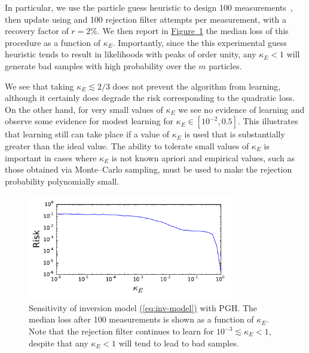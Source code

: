 \documentclass[twoside]{article}
\newcommand{\eq}[1]{\hyperref[eq:#1]{(\ref*{eq:#1})}}
\newcommand{\fig}[1]{\hyperref[fig:#1]{Figure~\ref*{fig:#1}}}
\begin{document}
In particular,
we use the particle guess heuristic to design 100 measurements~\cite{wiebe_efficient_2015}, then update using
and 100 rejection filter attempts per measurement, with a recovery factor of
$r=2\%$. We then report in \fig{sensitivity-kappa} the median loss of this procedure as a function
of $\kappa_E$. Importantly, since the this experimental guess heuristic tends to result in likelihoods with
peaks of order unity, any $\kappa_E < 1$ will generate bad samples with high probability over the $m$ particles.

We see that taking $\kappa_E\lesssim 2/3$ does not prevent the algorithm from learning, although it certainly does
degrade the risk corresponding to the quadratic loss.  On the other hand, for very small values of $\kappa_E$ we see no evidence of learning  and observe some evidence for modest learning for $\kappa_E \in [10^{-2}, 0.5]$.  This illustrates that learning still can take place if a value of $\kappa_E$ is used that
is substantially greater than the ideal value.  The ability to tolerate small values of $\kappa_E$ is important in cases where $\kappa_E$ is not known apriori and empirical values, such as those obtained via Monte--Carlo sampling, must be used to make the rejection probability polynomially small.

\begin{figure}
    \begin{center}
        \includegraphics[width=0.8\textwidth]{kappa_E-failure.pdf}
    \end{center}
    \caption{\label{fig:sensitivity-kappa}
        Sensitivity of inversion model \eq{inv-model} with PGH. The median loss
        after 100 measurements is shown as a function of $\kappa_E$. Note that the
        rejection filter continues to learn for $10^{-3} \lesssim \kappa_E < 1$,
        despite that any $\kappa_E < 1$ will tend to lead to bad samples.
    }
\end{figure}

\end{document}
